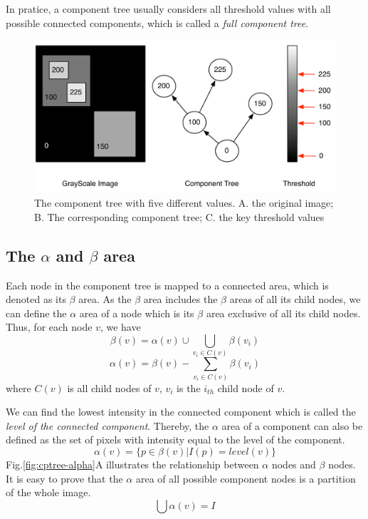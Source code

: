 In pratice, a component tree usually considers all threshold values with all possible connected components, which is called a \emph{full component tree}.

\begin{figure}[htbp]
\centering
\includegraphics[width=1.0\textwidth]{images/cptree_example}
\caption[An example of component tree with four levels and five components]{The component tree with five different values. A. the original image; B. The corresponding component tree; C. the key threshold values}
\label{fig:cptree-example}
\end{figure}
\subsection{The $\alpha$ and $\beta$ area} \label{sec:alpha-beta-area}
Each node in the component tree is mapped to a connected area, which is denoted as its $\beta$ area. As the $\beta$ area includes the $\beta$ areas of all its child nodes, we can define the $\alpha$ area of a node which is its $\beta$ area exclusive of all its child nodes. Thus, for each node $v$, we have
$$
\beta(v) = \alpha(v)\cup\bigcup_{v_i \in C(v)} \beta(v_i)   
$$
$$
\alpha(v) = \beta(v) - \sum_{v_i\in C(v)}\beta(v_i)
$$
where $C(v)$ is all child nodes of $v$, $v_i$ is the $i_{th}$ child node of $v$. 

We can find the lowest intensity in the connected component which is called the \emph{level of the connected component}. Thereby, the $\alpha$ area of a component can also be defined as the set of pixels with intensity equal to the level of the component.
$$
\alpha(v) = \{p \in \beta(v)| I(p) = level(v)\}
$$
Fig.\ref{fig:cptree-alpha}A illustrates the relationship between $\alpha$ nodes and $\beta$ nodes. It is easy to prove that the $\alpha$ area of all possible component nodes is a partition of the whole image. 
$$
\bigcup \alpha(v) = I
$$

